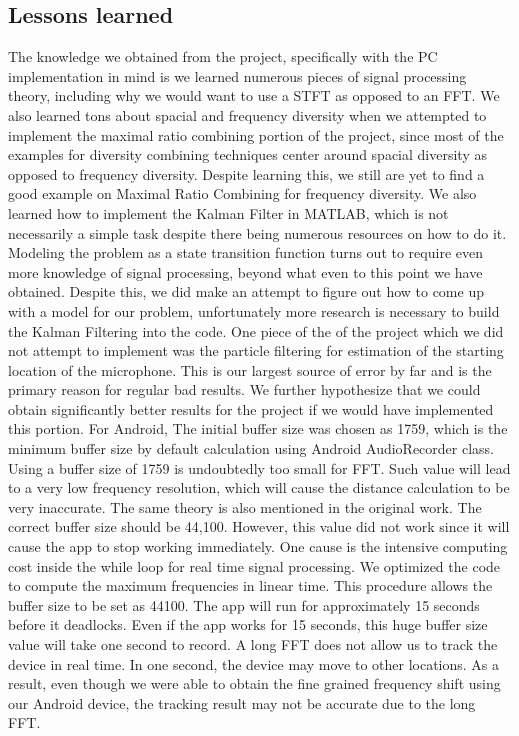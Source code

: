 \documentclass{acm_proc_article-sp}
\begin{document}
\subsection{Lessons learned}
The knowledge we obtained from the project, specifically with the PC implementation in mind is we learned numerous pieces of signal processing theory, including why we would want to use a STFT as opposed to an FFT. We also learned tons about spacial and frequency diversity when we attempted to implement the maximal ratio combining portion of the project, since most of the examples for diversity combining techniques center around spacial diversity as opposed to frequency diversity. Despite learning this, we still are yet to find a good example on Maximal Ratio Combining  for frequency diversity. We also learned how to implement the Kalman Filter in MATLAB, which is not necessarily a simple task despite there being numerous resources on how to do it. Modeling the problem as a state transition function turns out to require even more knowledge of signal processing, beyond what even to this point we have obtained. Despite this, we did make an attempt to figure out how to come up with a model for our problem, unfortunately more research is necessary to build the Kalman Filtering into the code. One piece of the of the project which we did not attempt to implement was the particle filtering for estimation of the starting location of the microphone. This is our largest source of error by far and is the primary reason for regular bad results. We further hypothesize that we could obtain significantly better results for the project if we would have implemented this portion.
For Android, The initial buffer size was chosen as 1759, which is the minimum
buffer size by default calculation using Android AudioRecorder class. 
Using a buffer size of 1759 is undoubtedly too small for FFT. Such value
will lead to a very low frequency resolution, which will cause the distance calculation
to be very inaccurate. The same theory is also mentioned in the original work. The correct
buffer size should be 44,100. However, this value did not work since 
it will cause the app to stop working immediately. One cause is the intensive
computing cost inside the while loop for real time signal processing. We 
optimized the code to compute the maximum frequencies in linear time. This procedure 
allows the buffer size to be set as 44100. The app will run for approximately 15 seconds
before it deadlocks.
Even if the app works for 15 seconds, this huge buffer size value will take one
second to record. A long FFT does not allow us to track the device in real time. In one
second, the device may move to other locations. As a result, even though we were able to
obtain the fine grained frequency shift using our Android device, the tracking result 
may not be accurate due to the long FFT.
\end{document}
